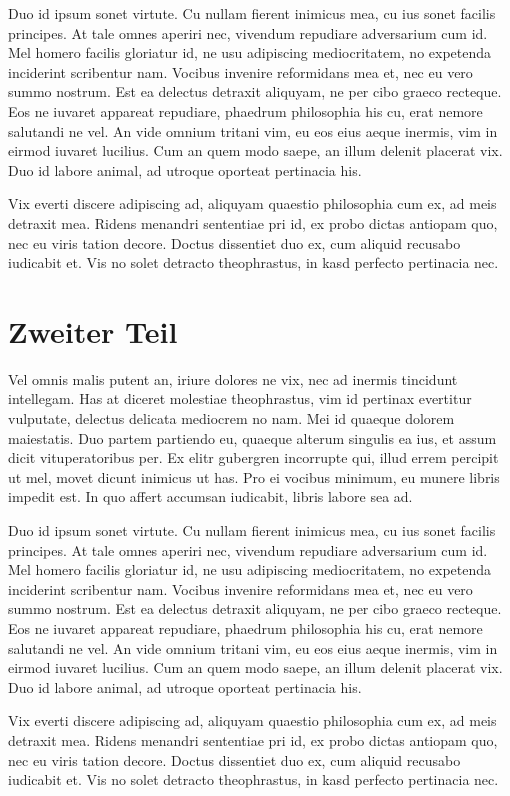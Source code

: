 Duo id ipsum sonet virtute. Cu nullam fierent inimicus mea, cu ius sonet facilis principes. At tale omnes aperiri nec, vivendum repudiare adversarium cum id. Mel homero facilis gloriatur id, ne usu adipiscing mediocritatem, no expetenda inciderint scribentur nam. Vocibus invenire reformidans mea et, nec eu vero summo nostrum. Est ea delectus detraxit aliquyam, ne per cibo graeco recteque. Eos ne iuvaret appareat repudiare, phaedrum philosophia his cu, erat nemore salutandi ne vel. An vide omnium tritani vim, eu eos eius aeque inermis, vim in eirmod iuvaret lucilius. Cum an quem modo saepe, an illum delenit placerat vix. Duo id labore animal, ad utroque oporteat pertinacia his.

Vix everti discere adipiscing ad, aliquyam quaestio philosophia cum ex, ad meis detraxit mea. Ridens menandri sententiae pri id, ex probo dictas antiopam quo, nec eu viris tation decore. Doctus dissentiet duo ex, cum aliquid recusabo iudicabit et. Vis no solet detracto theophrastus, in kasd perfecto pertinacia nec.

\section{Zweiter Teil}
\label{b_zweiter_teil}
Vel omnis malis putent an, iriure dolores ne vix, nec ad inermis tincidunt intellegam. Has at diceret molestiae theophrastus, vim id pertinax evertitur vulputate, delectus delicata mediocrem no nam. Mei id quaeque dolorem maiestatis. Duo partem partiendo eu, quaeque alterum singulis ea ius, et assum dicit vituperatoribus per. Ex elitr gubergren incorrupte qui, illud errem percipit ut mel, movet dicunt inimicus ut has. Pro ei vocibus minimum, eu munere libris impedit est. In quo affert accumsan iudicabit, libris labore sea ad.

Duo id ipsum sonet virtute. Cu nullam fierent inimicus mea, cu ius sonet facilis principes. At tale omnes aperiri nec, vivendum repudiare adversarium cum id. Mel homero facilis gloriatur id, ne usu adipiscing mediocritatem, no expetenda inciderint scribentur nam. Vocibus invenire reformidans mea et, nec eu vero summo nostrum. Est ea delectus detraxit aliquyam, ne per cibo graeco recteque. Eos ne iuvaret appareat repudiare, phaedrum philosophia his cu, erat nemore salutandi ne vel. An vide omnium tritani vim, eu eos eius aeque inermis, vim in eirmod iuvaret lucilius. Cum an quem modo saepe, an illum delenit placerat vix. Duo id labore animal, ad utroque oporteat pertinacia his.

Vix everti discere adipiscing ad, aliquyam quaestio philosophia cum ex, ad meis detraxit mea. Ridens menandri sententiae pri id, ex probo dictas antiopam quo, nec eu viris tation decore. Doctus dissentiet duo ex, cum aliquid recusabo iudicabit et. Vis no solet detracto theophrastus, in kasd perfecto pertinacia nec.